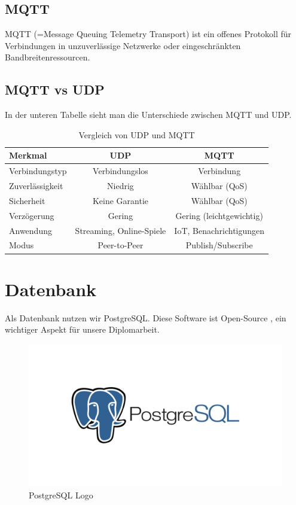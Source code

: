 \subsection{MQTT}
MQTT (=Message Queuing Telemetry Transport) ist ein offenes Protokoll für Verbindungen in unzuverlässige Netzwerke oder eingeschränkten Bandbreitenressourcen. \parencite{MQTT}

\subsection{MQTT vs UDP}
In der unteren Tabelle sieht man die Unterschiede zwischen MQTT und UDP.
\begin{table}[H]
	\centering
	\begin{tabular}{|l|c|c|}
		\hline
		\textbf{Merkmal} & \textbf{UDP} & \textbf{MQTT} \\
		\hline
		Verbindungstyp & Verbindungslos & Verbindung \\
		\hline
		Zuverlässigkeit & Niedrig & Wählbar (QoS) \\
		\hline
		Sicherheit & Keine Garantie & Wählbar (QoS) \\
		\hline
		Verzögerung & Gering & Gering (leichtgewichtig) \\
		\hline
		Anwendung & Streaming, Online-Spiele & IoT, Benachrichtigungen \\
		\hline
		Modus & Peer-to-Peer & Publish/Subscribe \\
		\hline
	\end{tabular}
	\caption{Vergleich von UDP und MQTT}
	\label{tab:udp_mqtt}
	\textcite{MQTTvsUDP}
\end{table}

\section{Datenbank}
Als Datenbank nutzen wir PostgreSQL. Diese Software ist Open-Source \parencite{PostgreSQL}, ein wichtiger Aspekt für unsere Diplomarbeit. 

\begin{figure}[H]
	\centering
	\includegraphics[width=0.5\linewidth]{images/postgres-logo.png}
	\caption[PostgreSQL Logo]{PostgreSQL Logo}
	\label{fig:PostgreSQLLogo}
\end{figure}

